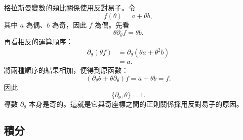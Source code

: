 格拉斯曼變數的類比關係使用反對易子。令
\begin{equation}
f(\theta)=a+\theta b,
\end{equation}
其中 \(a\) 為偶、\(b\) 為奇，因此 \(f\) 為偶。先看
\begin{equation}
\theta\partial_\theta f=\theta b.
\end{equation}
再看相反的運算順序：
\begin{align}
\partial_\theta(\theta f)
&=\partial_\theta(\theta a+\theta^2b)\\
&=a.
\end{align}
將兩種順序的結果相加，便得到原函數：
\begin{equation}
\left(\partial_\theta\theta+\theta\partial_\theta\right)f
=a+\theta b=f.
\end{equation}
因此
\begin{equation}
\boxed{\{\partial_\theta,\theta\}=1.}
\end{equation}
導數 \(\partial_\theta\) 本身是奇的。這就是它與奇座標之間的正則關係採用反對易子的原因。

\begin{classroomqa}
\end{classroomqa}

\begin{classroomqa}
\end{classroomqa}

\begin{classroomqa}
\end{classroomqa}

\subsection{積分}

